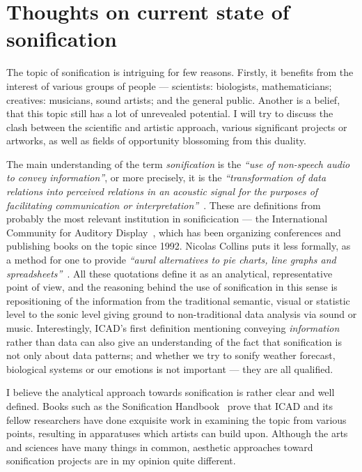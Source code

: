 \documentclass[12pt,a4paper,oneside]{report}
\begin{document}
\section{Thoughts on current state of sonification}

The topic of sonification is intriguing for few reasons. Firstly, it benefits from the interest of various groups of people --- scientists: biologists, mathematicians; creatives: musicians, sound artists; and the general public. Another is a belief, that this topic still has a lot of unrevealed potential. I will try to discuss the clash between the scientific and artistic approach, various significant projects or artworks, as well as fields of opportunity blossoming from this duality.

The main understanding of the term \emph{sonification} is the \emph{``use of non-speech audio to convey information''}, or more precisely, it is the \emph{``transformation of data relations into perceived relations in an acoustic signal for the purposes of facilitating communication or interpretation''}~\cite[p.~1]{Fitch}. These are definitions from probably the most relevant institution in sonificication --- the International Community for Auditory Display~\cite{icad}, which has been organizing conferences and publishing books on the topic since 1992. Nicolas Collins puts it less formally, as a method for one to provide \emph{``aural alternatives to pie charts, line graphs and spreadsheets''}~\cite[p.~7]{Collins2006}. All these quotations define it as an analytical, representative point of view, and the reasoning behind the use of sonification in this sense is repositioning of the information from the traditional semantic, visual or statistic level to the sonic level giving ground to non-traditional data analysis via sound or music. Interestingly, ICAD's first definition mentioning conveying \emph{information} rather than data can also give an understanding of the fact that sonification is not only about data patterns; and whether we try to sonify weather forecast, biological systems or our emotions is not important --- they are all qualified.

I believe the analytical approach towards sonification is rather clear and well defined. Books such as the Sonification Handbook~\cite{Hermann2011} prove that ICAD and its fellow researchers have done exquisite work in examining the topic from various points, resulting in apparatuses which artists can build upon. Although the arts and sciences have many things in common, aesthetic approaches toward sonification projects are in my opinion quite different.
\end{document}
